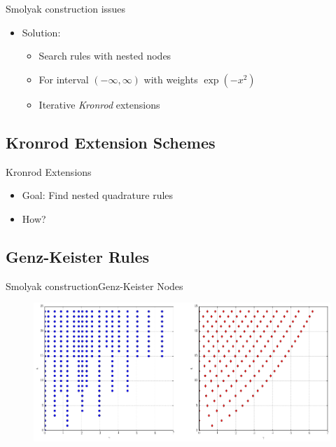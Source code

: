 \documentclass{beamer}
\begin{document}
\begin{frame}{Smolyak construction issues}
  \begin{itemize}
    \item Solution:
    \begin{itemize}
      \item Search rules with nested nodes
      \item For interval $(-\infty, \infty)$ with weights $\exp(-x^2)$
      \item Iterative \emph{Kronrod} extensions
    \end{itemize}
  \end{itemize}
\end{frame}


\subsection{Kronrod Extension Schemes}

\begin{frame}{Kronrod Extensions}
  \begin{itemize}
    \item Goal: Find nested quadrature rules
    \item How?
  \end{itemize}
\end{frame}


\subsection{Genz-Keister Rules}


\begin{frame}{Smolyak construction}{Genz-Keister Nodes}
  \begin{figure}
    \centering
    \includegraphics[width=\linewidth]{./fig/genz_keister_nodes.png}
  \end{figure}
\end{frame}
\end{document}
